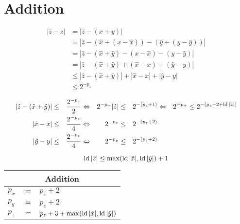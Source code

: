 %
%
\pagebreak
\section{Addition}

\begin{equation*}
\begin{split}
  |\hat{z}-z| & =  |\hat{z}-(x+y)| \\
              & =  |\hat{z}-(\hat{x}+(x-\hat{x}))-(\hat{y}+(y-\hat{y}))| \\
              & =  |\hat{z}-(\hat{x}+\hat{y})-(x-\hat{x})-(y-\hat{y})| \\
              & =  |\hat{z}-(\hat{x}+\hat{y})+(\hat{x}-x)+(\hat{y}-y)| \\
              &\le |\hat{z}-(\hat{x}+\hat{y})|+|\hat{x}-x|+|\hat{y}-y| \\
              &\le 2^{-p_z}
\end{split}
\end{equation*}

\begin{equation*}
\begin{split}
  |\hat{z}-(\hat{x}+\hat{y})| & \le & \frac{2^{-p_z}}{2}
  & \Leftrightarrow &
  2^{-p_+}|\hat{z}| & \le & 2^{-(p_z+1)}
  & \Leftrightarrow &
  2^{-p_+} \le 2^{-(p_z+2+\mathop{\rm ld}\nolimits|\hat{z}|)}
  \\
  |\hat{x}-x| & \le & \frac{2^{-p_z}}{4}
  & \Leftrightarrow &
  2^{-p_x} & \le & 2^{-(p_z+2)}
  &  &
  \\
  |\hat{y}-y| & \le & \frac{2^{-p_z}}{4}
  & \Leftrightarrow &
  2^{-p_y} & \le & 2^{-(p_z+2)}
  &  &
  \\
\end{split}
\end{equation*}

\begin{equation*}
  \mathop{\rm ld}\nolimits|\hat{z}| \le \max(\mathop{\rm ld}\nolimits|\hat{x}|,\mathop{\rm ld}\nolimits|\hat{y}|)+1
\end{equation*}

\begin{algorithm}
\phantom{}
\begin{center}
\renewcommand*{\arraystretch}{1.3}
\begin{tabular}{lcl}
  \hline
  \multicolumn{3}{c}{Addition} \\
  \hline
   $p_x$ & $\defeq$ & $p_z+2$ \\
   $p_y$ & $\defeq$ & $p_z+2$ \\
   $p_+$ & $\defeq$ & $p_z+3+\max(\mathop{\rm ld}\nolimits|\hat{x}|,\mathop{\rm ld}\nolimits|\hat{y}|)$ \\
  \hline
\end{tabular}
\end{center}
\end{algorithm}


